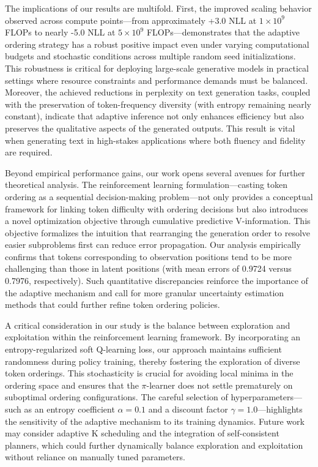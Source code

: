 \documentclass{article} %
\begin{document}
\par The implications of our results are multifold. First, the improved scaling behavior observed across compute points—from approximately +3.0 NLL at \(1 \times 10^9\) FLOPs to nearly -5.0 NLL at \(5 \times 10^9\) FLOPs—demonstrates that the adaptive ordering strategy has a robust positive impact even under varying computational budgets and stochastic conditions across multiple random seed initializations. This robustness is critical for deploying large-scale generative models in practical settings where resource constraints and performance demands must be balanced. Moreover, the achieved reductions in perplexity on text generation tasks, coupled with the preservation of token-frequency diversity (with entropy remaining nearly constant), indicate that adaptive inference not only enhances efficiency but also preserves the qualitative aspects of the generated outputs. This result is vital when generating text in high-stakes applications where both fluency and fidelity are required.

\par Beyond empirical performance gains, our work opens several avenues for further theoretical analysis. The reinforcement learning formulation—casting token ordering as a sequential decision-making problem—not only provides a conceptual framework for linking token difficulty with ordering decisions but also introduces a novel optimization objective through cumulative predictive V-information. This objective formalizes the intuition that rearranging the generation order to resolve easier subproblems first can reduce error propagation. Our analysis empirically confirms that tokens corresponding to observation positions tend to be more challenging than those in latent positions (with mean errors of 0.9724 versus 0.7976, respectively). Such quantitative discrepancies reinforce the importance of the adaptive mechanism and call for more granular uncertainty estimation methods that could further refine token ordering policies.

\par A critical consideration in our study is the balance between exploration and exploitation within the reinforcement learning framework. By incorporating an entropy-regularized soft Q-learning loss, our approach maintains sufficient randomness during policy training, thereby fostering the exploration of diverse token orderings. This stochasticity is crucial for avoiding local minima in the ordering space and ensures that the $\pi$-learner does not settle prematurely on suboptimal ordering configurations. The careful selection of hyperparameters—such as an entropy coefficient \(\alpha=0.1\) and a discount factor \(\gamma=1.0\)—highlights the sensitivity of the adaptive mechanism to its training dynamics. Future work may consider adaptive K scheduling and the integration of self-consistent planners, which could further dynamically balance exploration and exploitation without reliance on manually tuned parameters.
\end{document}
